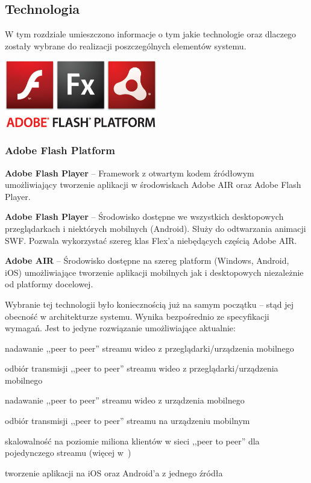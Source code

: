 \newpage
\subsection{Technologia}
W tym rozdziale umieszczono informacje o tym jakie technologie oraz dlaczego zostały wybrane do realizacji poszczególnych elementów systemu.

\begin{minipage}{\textwidth}
    \begin{center}
        \includegraphics[width=0.5\textwidth]{img/logos/adobe-flash-platform.jpg}
    \end{center}
    \subsubsection{Adobe Flash Platform}
    \begin{packed_item}
        \item{\textbf{Adobe Flash Player} -- Framework z otwartym kodem źródłowym umożliwiający tworzenie aplikacji w środowiskach Adobe AIR oraz Adobe Flash Player.}
        \item{\textbf{Adobe Flash Player} --  Środowisko dostępne we wszystkich desktopowych przeglądarkach i niektórych mobilnych (Android). Służy do odtwarzania animacji SWF. Pozwala wykorzystać szereg klas Flex'a niebędących częścią Adobe AIR.}
        \item{\textbf{Adobe AIR} -- Środowisko dostępne na szereg platform (Windows, Android, iOS) umożliwiające tworzenie aplikacji mobilnych jak i desktopowych niezależnie od platformy docelowej.}
    \end{packed_item}

    Wybranie tej technologii było koniecznością już na samym początku -- stąd jej obecność w architekturze systemu. Wynika bezpośrednio ze specyfikacji wymagań. Jest to jedyne rozwiązanie umożliwiające aktualnie:
    \begin{packed_item}
        \item{nadawanie ,,peer to peer'' streamu wideo z przeglądarki/urządzenia mobilnego}
        \item{odbiór transmisji ,,peer to peer'' streamu wideo z przeglądarki/urządzenia mobilnego}
        \item{nadawanie ,,peer to peer'' streamu wideo z urządzenia mobilnego}
        \item{odbiór transmisji ,,peer to peer'' streamu na urządzeniu mobilnym}
        \item{skalowalność na poziomie miliona klientów w sieci ,,peer to peer'' dla pojedynczego streamu (więcej w~\cite{MattKauf2009})}
        \item{tworzenie aplikacji na iOS oraz Android'a z jednego źródła}
    \end{packed_item}


\end{minipage}
